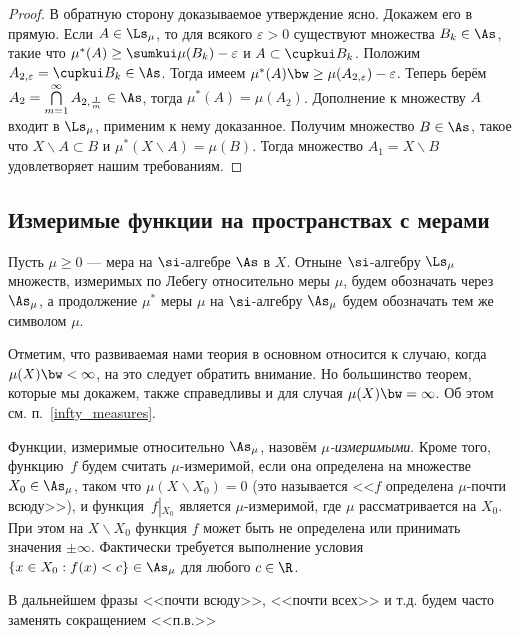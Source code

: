 \documentclass[10pt]{article}
\newcommand{\ve}{\varepsilon}
\begin{document}
\begin{proof}
В обратную сторону доказываемое утверждение ясно. Докажем его в
прямую. Если $A\in\Ls_\mu$, то для всякого $\ve>0$ существуют
множества $B_k\in\As$, такие что $\mu^*(A)\ge\sumkui\mu(B_k)-\ve$ и
$A\subset\cupkui B_k$. Положим $A_{2,\ve}=\cupkui B_k\in\As$. Тогда
имеем $\mu^*(A)\bw\ge\mu(A_{2,\ve})-\ve$. Теперь берём
$A_2=\bigcap\limits_{m=1}^\infty A_{2,\frac1m}\in\As$, тогда
$\mu^*(A)=\mu(A_2)$. Дополнение к множеству $A$ входит в $\Ls_\mu$,
применим к нему доказанное. Получим множество $B\in\As$, такое что
$X\backslash A\subset B$ и $\mu^*(X\backslash A)=\mu(B)$. Тогда
множество $A_1=X\backslash B$ удовлетворяет нашим требованиям.
\end{proof}


\subsection{Измеримые функции на пространствах с мерами}

Пусть $\mu\ge0$ --- мера на $\si$-алгебре $\As$ в $X$. Отныне
$\si$-алгебру $\Ls_\mu$ множеств, измеримых по Лебегу относительно
меры $\mu$, будем обозначать через $\As_\mu$, а продолжение $\mu^*$
меры $\mu$ на $\si$-алгебру $\As_\mu$ будем обозначать тем же
символом $\mu$.

Отметим, что развиваемая нами теория в основном относится к случаю,
когда $\mu(X)\bw <\infty$, на это следует обратить внимание. Но
большинство теорем, которые мы докажем, также справедливы и для
случая $\mu(X)\bw =\infty$. Об этом см. п.~\ref{infty_measures}.

\begin{df}
Функции, измеримые относительно $\As_\mu$, назовём
\emph{$\mu$-измеримыми}. Кроме того, функцию~$f$ будем считать
$\mu$-измеримой, если она определена на множестве $X_0\in\As_\mu$,
таком что $\mu(X\backslash X_0)=0$ (это называется <<$f$
определена $\mu$-почти всюду>>), и функция~$f\left|_{X_0}\right.$
является $\mu$-измеримой, где $\mu$ рассматривается на $X_0$. При
этом на $X\backslash X_0$ функция $f$ может быть не определена или
принимать значения $\pm\infty$. Фактически требуется выполнение
условия $\{x\in X_0: f(x)<c\}\in\As_\mu$ для любого $c\in\R$.
\end{df}

\begin{note}
В дальнейшем фразы <<почти всюду>>, <<почти всех>> и т.д.
будем часто заменять сокращением <<п.в.>>
\end{note}
\end{document}
